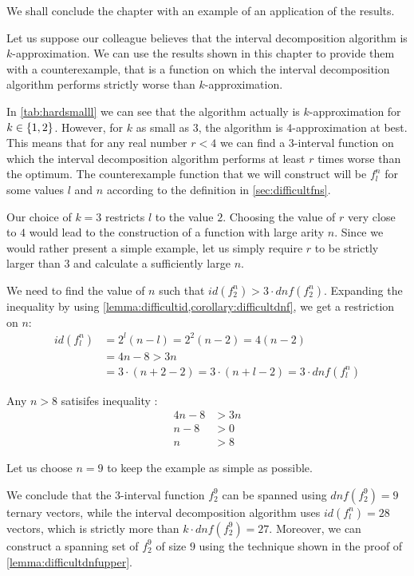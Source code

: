 We shall conclude the chapter with an example
of an application of the results.
\begin{example}
\label{example:approxidf24}
Let us
suppose our colleague believes
that the interval decomposition algorithm
is $k$-approximation.
We can use the results shown in this chapter
to provide them with a counterexample,
that is a function on which
the interval decomposition algorithm
performs strictly worse than $k$-approximation.

In \cref{tab:hardsmalll} we can see that the algorithm
actually is $k$-approximation for $k \in \{1, 2\}$.
However, for $k$ as small as $3$,
the algorithm is $4$-approximation at best.
This means that for any real number $r < 4$
we can find a $3$-interval function on which
the interval decomposition algorithm
performs at least $r$ times worse than the optimum.
The counterexample function that we will construct
will be $f_l^n$ for some values $l$ and $n$
according to the definition in \cref{sec:difficultfns}.

Our choice of $k=3$ restricts $l$ to the value $2$.
Choosing the value of $r$ very close to $4$
would lead to the construction of a function
with large arity $n$.
Since we would rather present a simple example,
let us
simply require $r$ to be strictly larger than $3$
and calculate a sufficiently large $n$.

We need to find the value of $n$ such that
$id(f_2^n) > 3 \cdot dnf(f_2^n)$.
Expanding the inequality by using
\cref{lemma:difficultid,corollary:difficultdnf},
we get a restriction on $n$:
\begin{align}
id(f_l^n) &= 2^l(n-l)
= 2^2(n-2)
= 4 (n-2) \nonumber \\
&= 4n - 8
> 3n
\label{ineq:examplef29} \\
&= 3 \cdot (n+2-2)
= 3 \cdot (n+l-2)
= 3 \cdot \mathit{dnf}(f_l^n) \nonumber
\end{align}

Any $n > 8$ satisifes
inequality :
\begin{align*}
4n - 8 &> 3n \\
n - 8 &> 0 \\
n &> 8
\end{align*}

Let us choose $n=9$
to keep the example as simple as possible.

We conclude that the $3$-interval function $f_2^9$
can be spanned using
$dnf(f_2^9) = 9$ ternary vectors,
while the interval decomposition algorithm
uses $id(f_l^n) = 28$ vectors,
which is strictly more than $k \cdot dnf(f_2^9) = 27$.
Moreover, we can construct a spanning set of $f_2^9$
of size $9$ using the technique shown
in the proof of \cref{lemma:difficultdnfupper}.
\end{example}
